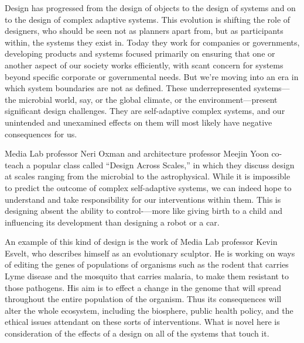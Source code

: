 Design has progressed from the design of objects to the design of systems and on to the design of complex adaptive systems. This evolution is shifting the role of designers, who should be seen not as planners apart from, but as participants within, the systems they exist in. Today they work for companies or governments, developing products and systems focused primarily on ensuring that one or another aspect of our society works efficiently, with scant concern for systems beyond specific corporate or governmental needs. But we're moving into an era in which system boundaries are not as defined. These underrepresented systems—the microbial world, say, or the global climate, or the environment—present significant design challenges. They are self-adaptive complex systems, and our unintended and unexamined effects on them will most likely have negative consequences for us.

Media Lab professor Neri Oxman and architecture professor Meejin Yoon co-teach a popular class called ``Design Across Scales,'' in which they discuss design at scales ranging from the microbial to the astrophysical. While it is impossible to predict the outcome of complex self-adaptive systems, we can indeed hope to understand and take responsibility for our interventions within them. This is designing absent the ability to control-—more like giving birth to a child and influencing its development than designing a robot or a car.

An example of this kind of design is the work of Media Lab professor Kevin Esvelt, who describes himself as an evolutionary sculptor. He is working on ways of editing the genes of populations of organisms such as the rodent that carries Lyme disease and the mosquito that carries malaria, to make them resistant to those pathogens. His aim is to effect a change in the genome that will spread throughout the entire population of the organism. Thus its consequences will alter the whole ecosystem, including the biosphere, public health policy, and the ethical issues attendant on these sorts of interventions. What is novel here is consideration of the effects of a design on all of the systems that touch it.

